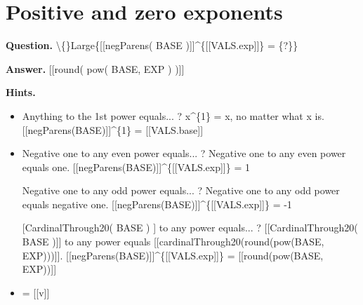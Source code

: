 \documentclass{article}
\begin{document}
\section*{Positive and zero exponents}
\textbf{Question.} \textbackslash\{\}Large\{[[negParens( BASE )]]\textasciicircum{}\{[[VALS.exp]]\} = \{?\}\}

\textbf{Answer.} [[round( pow( BASE, EXP ) )]]

\textbf{Hints.}
\begin{itemize}
  \item Anything to the 1st power equals... ?
                        x\textasciicircum{}\{1\} = x, no matter what x is.
                        [[negParens(BASE)]]\textasciicircum{}\{1\} = [[VALS.base]]
  \item Negative one to any even power equals... ?
                            Negative one to any even power equals one.
                            [[negParens(BASE)]]\textasciicircum{}\{[[VALS.exp]]\} = 1
                        
                            Negative one to any odd power equals... ?
                            Negative one to any odd power equals negative one.
                            [[negParens(BASE)]]\textasciicircum{}\{[[VALS.exp]]\} = -1
  \item [[CardinalThrough20( BASE )]] to any power equals... ?
                        [[CardinalThrough20( BASE )]] to any power equals [[cardinalThrough20(round(pow(BASE, EXP)))]].
                        [[negParens(BASE)]]\textasciicircum{}\{[[VALS.exp]]\} = [[round(pow(BASE, EXP))]]
  \item = [[v]]
\end{itemize}
\end{document}
